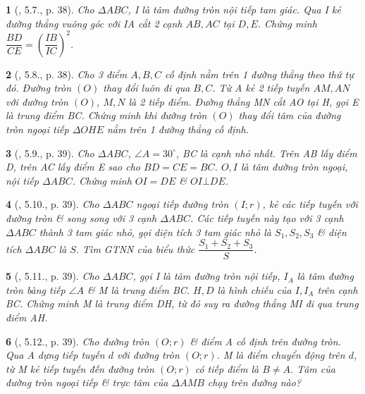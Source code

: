 \documentclass{article}
\newtheorem{baitoan}{}
\begin{document}
\begin{baitoan}[\cite{TLCT_THCS_Toan_9_hinh_hoc}, 5.7., p. 38]
	Cho $\Delta ABC$, I là tâm đường tròn nội tiếp tam giác. Qua I kẻ đường thẳng vuông góc với IA cắt 2 cạnh $AB,AC$ tại $D,E$. Chứng minh $\dfrac{BD}{CE} = \left(\dfrac{IB}{IC}\right)^2$.
\end{baitoan}

\begin{baitoan}[\cite{TLCT_THCS_Toan_9_hinh_hoc}, 5.8., p. 38]
	Cho 3 điểm $A,B,C$ cố định nằm trên 1 đường thẳng theo thứ tự đó. Đường tròn $(O)$ thay đổi luôn đi qua $B,C$. Từ A kẻ 2 tiếp tuyến $AM,AN$ với đường tròn $(O)$, $M,N$ là 2 tiếp điểm. Đường thẳng MN cắt AO tại H, gọi E là trung điểm BC. Chứng minh khi đường tròn $(O)$ thay đổi tâm của đường tròn ngoại tiếp $\Delta OHE$ nằm trên 1 đường thẳng cố định.
\end{baitoan}

\begin{baitoan}[\cite{TLCT_THCS_Toan_9_hinh_hoc}, 5.9., p. 39]
	Cho $\Delta ABC$, $\angle{A} = 30^\circ$, BC là cạnh nhỏ nhất. Trên AB lấy điểm D, trên AC lấy điểm E sao cho $BD = CE = BC$. $O,I$ là tâm đường tròn ngoại, nội tiếp $\Delta ABC$. Chứng minh $OI = DE$ \& $OI\bot DE$.
\end{baitoan}

\begin{baitoan}[\cite{TLCT_THCS_Toan_9_hinh_hoc}, 5.10., p. 39]
	Cho $\Delta ABC$ ngoại tiếp đường tròn $(I;r)$, kẻ các tiếp tuyến với đường tròn \& song song với 3 cạnh $\Delta ABC$. Các tiếp tuyến này tạo với 3 cạnh $\Delta ABC$ thành 3 tam giác nhỏ, gọi diện tích 3 tam giác nhỏ là $S_1,S_2,S_3$ \& diện tích $\Delta ABC$ là $S$. Tìm {\rm GTNN} của biểu thức $\dfrac{S_1 + S_2 + S_3}{S}$.
\end{baitoan}

\begin{baitoan}[\cite{TLCT_THCS_Toan_9_hinh_hoc}, 5.11., p. 39]
	Cho $\Delta ABC$, gọi I là tâm đường tròn nội tiếp, $I_A$ là tâm đường tròn bàng tiếp $\angle{A}$ \& M là trung điểm BC. $H,D$ là hình chiếu của $I,I_A$ trên cạnh BC. Chứng minh M là trung điểm DH, từ đó suy ra đường thẳng MI đi qua trung điểm AH.
\end{baitoan}

\begin{baitoan}[\cite{TLCT_THCS_Toan_9_hinh_hoc}, 5.12., p. 39]
	Cho đường tròn $(O;r)$ \& điểm A cố định trên đường tròn. Qua A dựng tiếp tuyến $d$ với đường tròn $(O;r)$. M là điểm chuyển động trên $d$, từ M kẻ tiếp tuyến đến đường tròn $(O;r)$ có tiếp điểm là $B\ne A$. Tâm của đường tròn ngoại tiếp \& trực tâm của $\Delta AMB$ chạy trên đường nào?
\end{baitoan}
\end{document}
